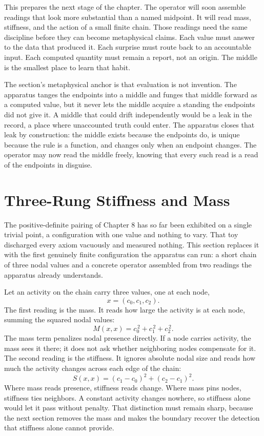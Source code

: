 This prepares the next stage of the chapter. The operator will soon assemble
readings that look more substantial than a named midpoint. It will read mass,
stiffness, and the action of a small finite chain. Those readings need the same
discipline before they can become metaphysical claims. Each value must answer to
the data that produced it. Each surprise must route back to an accountable input.
Each computed quantity must remain a report, not an origin. The middle is the
smallest place to learn that habit.

The section's metaphysical anchor is that evaluation is not invention. The
apparatus tanges the endpoints into a middle and funges that middle forward as a
computed value, but it never lets the middle acquire a standing the endpoints did
not give it. A middle that could drift independently would be a leak in the
record, a place where unaccounted truth could enter. The apparatus closes that
leak by construction: the middle exists because the endpoints do, is unique
because the rule is a function, and changes only when an endpoint changes. The
operator may now read the middle freely, knowing that every such read is a read of
the endpoints in disguise.

\section{Three-Rung Stiffness and Mass}

The positive-definite pairing of Chapter 8 has so far been exhibited on a single
trivial point, a configuration with one value and nothing to vary. That toy
discharged every axiom vacuously and measured nothing. This section replaces it
with the first genuinely finite configuration the apparatus can run: a short chain
of three nodal values and a concrete operator assembled from two readings the
apparatus already understands.

Let an activity on the chain carry three values, one at each node,
\[
  x = (c_0, c_1, c_2).
\]
The first reading is the mass. It reads how large the activity is at each node,
summing the squared nodal values:
\[
  M(x,x) = c_0^{\,2} + c_1^{\,2} + c_2^{\,2}.
\]
The mass term penalizes nodal presence directly. If a node carries activity, the
mass sees it there; it does not ask whether neighboring nodes compensate for it.
The second reading is the stiffness. It ignores absolute nodal size and reads
how much the activity changes across each edge of the chain:
\[
  S(x,x) = (c_1 - c_0)^{2} + (c_2 - c_1)^{2}.
\]
Where mass reads presence, stiffness reads change. Where mass pins nodes,
stiffness ties neighbors. A constant activity changes nowhere, so stiffness
alone would let it pass without penalty. That distinction must remain sharp,
because the next section removes the mass and makes the boundary recover the
detection that stiffness alone cannot provide.

